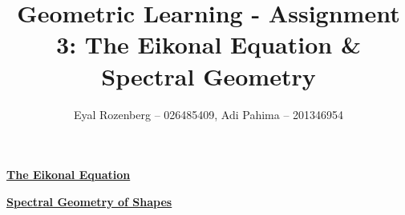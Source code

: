 \documentclass{homeworg}
\title{Geometric Learning - Assignment 3: The Eikonal Equation \& Spectral Geometry}
\author{Eyal Rozenberg -- 026485409, Adi Pahima -- 201346954}
\begin{document}
\maketitle
\newpage \exercise \underline{\textbf{The Eikonal Equation}}
\label{sec:Q1}



\newpage \exercise \underline{\textbf{Spectral Geometry of Shapes}}
\label{sec:Q2}

\end{document}
